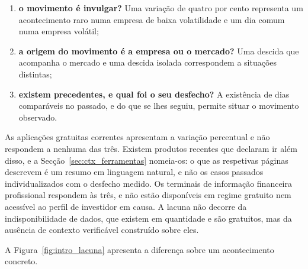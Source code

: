 \begin{enumerate}
  \item \textbf{o movimento é invulgar?} Uma variação de quatro por cento representa um
        acontecimento raro numa empresa de baixa volatilidade e um dia comum numa empresa volátil;
  \item \textbf{a origem do movimento é a empresa ou o mercado?} Uma descida que acompanha o
        mercado e uma descida isolada correspondem a situações distintas;
  \item \textbf{existem precedentes, e qual foi o seu desfecho?} A existência de dias comparáveis
        no passado, e do que se lhes seguiu, permite situar o movimento observado.
\end{enumerate}

As aplicações gratuitas correntes apresentam a variação percentual e não respondem a nenhuma
das três. Existem produtos recentes que declaram ir além disso, e a
Secção~\ref{sec:ctx_ferramentas} nomeia-os: o que as respetivas páginas descrevem é um resumo
em linguagem natural, e não os casos passados individualizados com o desfecho medido. Os
terminais de informação financeira profissional respondem às três, e não estão disponíveis em
regime gratuito nem acessível ao perfil de investidor em causa. A lacuna não decorre da indisponibilidade de
dados, que existem em quantidade e são gratuitos, mas da ausência de contexto verificável
construído sobre eles.

A Figura~\ref{fig:intro_lacuna} apresenta a diferença sobre um acontecimento concreto.

